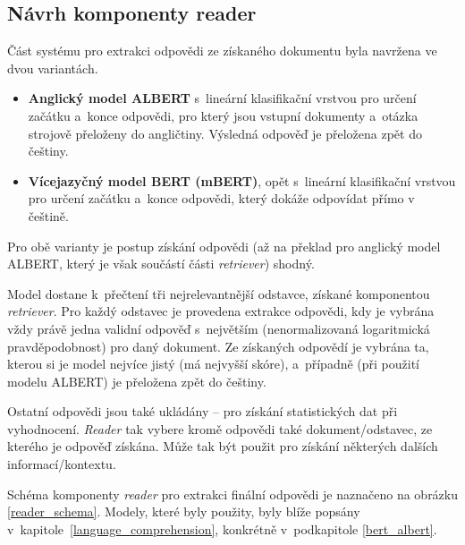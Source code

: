 \subsection{Návrh komponenty reader}
Část systému pro extrakci odpovědi ze získaného dokumentu byla navržena ve dvou variantách.
\begin{itemize}
    \item \textbf{Anglický model ALBERT} s~lineární klasifikační vrstvou pro určení začátku a~konce odpovědi, pro který jsou vstupní dokumenty a~otázka strojově přeloženy do angličtiny. Výsledná odpověď je přeložena zpět do češtiny.
    \item \textbf{Vícejazyčný model BERT (mBERT)}, opět s~lineární klasifikační vrstvou pro určení začátku a~konce odpovědi, který dokáže odpovídat přímo v češtině.
\end{itemize}
Pro obě varianty je postup získání odpovědi (až na překlad pro anglický model ALBERT, který je však součástí části \emph{retriever}) shodný.\par
Model dostane k~přečtení tři nejrelevantnější odstavce, získané komponentou \emph{retriever}. Pro každý odstavec je provedena extrakce odpovědi, kdy je vybrána vždy právě jedna validní odpověď s~největším  (nenormalizovaná logaritmická pravděpodobnost) pro daný dokument. Ze získaných odpovědí je vybrána ta, kterou si je model nejvíce jistý (má nejvyšší skóre), a~případně (při použití modelu ALBERT) je přeložena zpět do češtiny.\par
\noindent Ostatní odpovědi jsou také ukládány -- pro získání statistických dat při vyhodnocení. \emph{Reader} tak vybere kromě odpovědi také dokument/odstavec, ze kterého je odpověď získána. Může tak být použit pro získání některých dalších informací/kontextu.\par
Schéma komponenty \emph{reader} pro extrakci finální odpovědi je naznačeno na obrázku \ref{reader_schema}. Modely, které byly použity, byly blíže popsány v~kapitole~\ref{language_comprehension}, konkrétně v~podkapitole \ref{bert_albert}.

